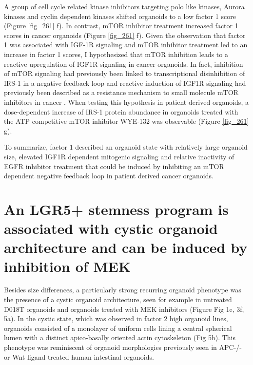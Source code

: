 \begin{flushleft}
\bigbreak
A group of cell cycle related kinase inhibitors targeting polo like kinases, Aurora kinases and cyclin dependent kinases shifted organoids to a low factor 1 score (Figure \ref{fig_261} f). In contrast, mTOR inhibitor treatment increased factor 1 scores in cancer organoids (Figure \ref{fig_261} f). Given the observation that factor 1 was associated with IGF-1R signaling and mTOR inhibitor treatment led to an increase in factor 1 scores, I hypothesized that mTOR inhibition leads to a reactive upregulation of IGF1R signaling in cancer organoids. In fact, inhibition of mTOR signaling had previously been linked to transcriptional disinhibition of IRS-1 in a negative feedback loop \cite{OReilly2006-fc} and  reactive induction of IGF1R signaling had previously been described as a resistance mechanism to small molecule mTOR inhibitors in cancer \cite{Sharma2010-qa}. When testing this hypothesis in patient derived organoids, a dose-dependent increase of IRS-1 protein abundance in organoids treated with the ATP competitive mTOR inhibitor WYE-132 was observable (Figure \ref{fig_261} g). 

\bigbreak
To summarize, factor 1 described an organoid state with relatively large organoid size, elevated IGF1R dependent mitogenic signaling and relative inactivity of EGFR inhibitor treatment that could be induced by inhibiting an mTOR dependent negative feedback loop in patient derived cancer organoids.

\newpage
\section{An LGR5+ stemness program is associated with cystic organoid architecture and can be induced by inhibition of MEK}

Besides size differences, a particularly strong recurring organoid phenotype was the presence of a cystic organoid architecture, seen for example in untreated D018T organoids and organoids treated with MEK inhibitors (Figure Fig 1e, 3f, 5a). In the cystic state, which was observed in factor 2 high organoid lines, organoids consisted of a monolayer of uniform cells lining a central spherical lumen with a distinct apico-basally oriented actin cytoskeleton (Fig 5b). This phenotype was reminiscent of organoid morphologies previously seen in APC-/- or Wnt ligand treated human intestinal organoids. 


\end{flushleft}
